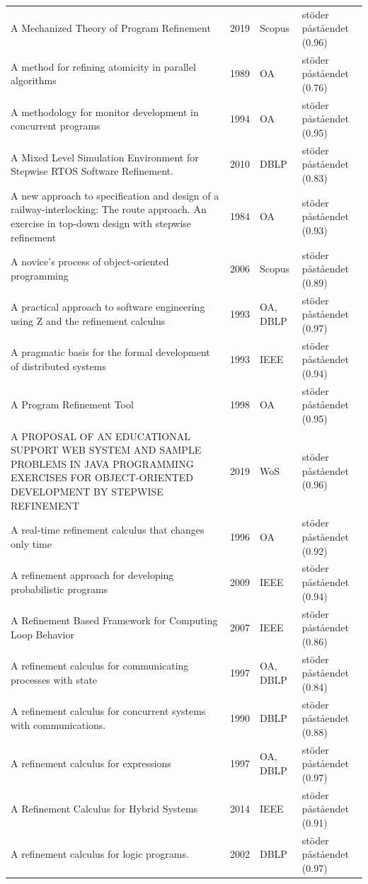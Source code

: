 \begin{longtable}{@{}%
  >{\raggedright\arraybackslash}p{}c%
  >{\raggedright\arraybackslash}p{}%
  >{\raggedright\arraybackslash}p{}@{}}
A Mechanized Theory of Program Refinement & 2019 & Scopus & stöder påståendet (0.96) \\
A method for refining atomicity in parallel algorithms & 1989 & OA & stöder påståendet (0.76) \\
A methodology for monitor development in concurrent programs & 1994 & OA & stöder påståendet (0.95) \\
A Mixed Level Simulation Environment for Stepwise RTOS Software Refinement. & 2010 & DBLP & stöder påståendet (0.83) \\
A new approach to specification and design of a railway-interlocking: The \textquotedbl{}route\textquotedbl{} approach. An exercise in top-down design with stepwise refinement & 1984 & OA & stöder påståendet (0.93) \\
A novice's process of object-oriented programming & 2006 & Scopus & stöder påståendet (0.89) \\
A practical approach to software engineering using Z and the refinement calculus & 1993 & OA, DBLP & stöder påståendet (0.97) \\
A pragmatic basis for the formal development of distributed systems & 1993 & IEEE & stöder påståendet (0.94) \\
A Program Refinement Tool & 1998 & OA & stöder påståendet (0.95) \\
A PROPOSAL OF AN EDUCATIONAL SUPPORT WEB SYSTEM AND SAMPLE PROBLEMS IN JAVA PROGRAMMING EXERCISES FOR OBJECT-ORIENTED DEVELOPMENT BY STEPWISE REFINEMENT & 2019 & WoS & stöder påståendet (0.96) \\
A real-time refinement calculus that changes only time & 1996 & OA & stöder påståendet (0.92) \\
A refinement approach for developing probabilistic programs & 2009 & IEEE & stöder påståendet (0.94) \\
A Refinement Based Framework for Computing Loop Behavior & 2007 & IEEE & stöder påståendet (0.86) \\
A refinement calculus for communicating processes with state & 1997 & OA, DBLP & stöder påståendet (0.84) \\
A refinement calculus for concurrent systems with communications. & 1990 & DBLP & stöder påståendet (0.88) \\
A refinement calculus for expressions & 1997 & OA, DBLP & stöder påståendet (0.97) \\
A Refinement Calculus for Hybrid Systems & 2014 & IEEE & stöder påståendet (0.91) \\
A refinement calculus for logic programs. & 2002 & DBLP & stöder påståendet (0.97) \\

\end{longtable}
